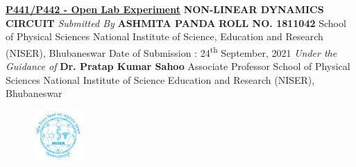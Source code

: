 \documentclass[12pt]{article}
\begin{document}
\doublespace
\begin{titlepage}
	\begin{center}
		\vspace*{0.2cm}
		\textbf{\uline{P441/P442 - Open Lab Experiment}} \linebreak
		\vspace{1.5cm}\linebreak
		\textbf{\Large{NON-LINEAR DYNAMICS CIRCUIT}}\linebreak
		\vspace{2cm} \linebreak
		\textit{Submitted By} \linebreak \textbf{ASHMITA PANDA} \linebreak 
		\textbf{ROLL NO. 1811042} \linebreak
		School of Physical Sciences \linebreak National Institute of Science, Education and Research (NISER), Bhubaneswar \linebreak
		Date of Submission : 24\textsuperscript{th} September, 2021
		\vspace{2.5cm} \linebreak
		\textit{Under the Guidance of} \linebreak \textbf{Dr. Pratap Kumar Sahoo} \linebreak Associate Professor \linebreak School of Physical Sciences \linebreak National Institute of Science Education and Research (NISER), Bhubaneswar
		\vspace{1cm} \linebreak

	\end{center}
	\begin{figure}[H]
		\centering
		\includegraphics[width=0.17\textwidth]{niser logo}
	\end{figure}
\end{titlepage}

\raggedright
\newpage
{}

\singlespacing
\tableofcontents
{}
\onehalfspacing
\end{document}
